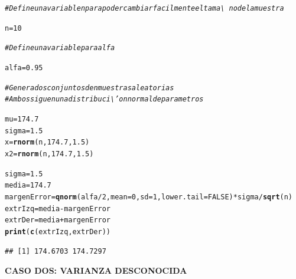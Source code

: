 \documentclass[12pt,letterpaper]{article}\usepackage[]{graphicx}\usepackage[]{color}
\makeatletter
\newcommand{\hlnum}[1]{\textcolor[rgb]{0.686,0.059,0.569}{#1}}%
\newcommand{\hlcom}[1]{\textcolor[rgb]{0.678,0.584,0.686}{\textit{#1}}}%
\newcommand{\hlopt}[1]{\textcolor[rgb]{0,0,0}{#1}}%
\newcommand{\hlstd}[1]{\textcolor[rgb]{0.345,0.345,0.345}{#1}}%
\newcommand{\hlkwb}[1]{\textcolor[rgb]{0.69,0.353,0.396}{#1}}%
\newcommand{\hlkwc}[1]{\textcolor[rgb]{0.333,0.667,0.333}{#1}}%
\newcommand{\hlkwd}[1]{\textcolor[rgb]{0.737,0.353,0.396}{\textbf{#1}}}%
\newenvironment{kframe}{%
 \def\at@end@of@kframe{}%
 \ifinner\ifhmode%
  \def\at@end@of@kframe{\end{minipage}}%
  \begin{minipage}{\columnwidth}%
 \fi\fi%
 \def\FrameCommand##1{\hskip\@totalleftmargin \hskip-\fboxsep
 \colorbox{shadecolor}{##1}\hskip-\fboxsep
     \hskip-\linewidth \hskip-\@totalleftmargin \hskip\columnwidth}%
 \MakeFramed {\advance\hsize-\width
   \@totalleftmargin\z@ \linewidth\hsize
   \@setminipage}}%
 {\par\unskip\endMakeFramed%
 \at@end@of@kframe}
\newenvironment{knitrout}{}{} %
\makeatother
\begin{document}
\begin{knitrout}
\color{fgcolor}\begin{kframe}
\begin{alltt}
\hlcom{# Define una variable n para poder cambiar facilmente el tama\textbackslash{}~no de la muestra}

\hlstd{n} \hlkwb{=} \hlnum{10}

\hlcom{# Define una variable para alfa }

\hlstd{alfa} \hlkwb{=} \hlnum{0.95}

\hlcom{# Genera dos conjuntos de n muestras aleatorias }
\hlcom{# Ambos siguen una distribuci\textbackslash{}'on normal de parametros }

\hlstd{mu} \hlkwb{=} \hlnum{174.7}
\hlstd{sigma} \hlkwb{=} \hlnum{1.5}
\hlstd{x} \hlkwb{=} \hlkwd{rnorm}\hlstd{(n,} \hlnum{174.7}\hlstd{,} \hlnum{1.5}\hlstd{)}
\hlstd{x2} \hlkwb{=} \hlkwd{rnorm}\hlstd{(n,} \hlnum{174.7}\hlstd{,} \hlnum{1.5}\hlstd{)}

\hlstd{sigma} \hlkwb{=} \hlnum{1.5}
\hlstd{media} \hlkwb{=} \hlnum{174.7}
\hlstd{margenError} \hlkwb{=} \hlkwd{qnorm}\hlstd{(alfa}\hlopt{/}\hlnum{2}\hlstd{,} \hlkwc{mean}\hlstd{=}\hlnum{0}\hlstd{,} \hlkwc{sd}\hlstd{=}\hlnum{1}\hlstd{,} \hlkwc{lower.tail} \hlstd{=} \hlnum{FALSE}\hlstd{)}\hlopt{*}\hlstd{sigma}\hlopt{/}\hlkwd{sqrt}\hlstd{(n)}
\hlstd{extrIzq} \hlkwb{=} \hlstd{media} \hlopt{-} \hlstd{margenError}
\hlstd{extrDer} \hlkwb{=} \hlstd{media} \hlopt{+} \hlstd{margenError}
\hlkwd{print}\hlstd{(}\hlkwd{c}\hlstd{(extrIzq, extrDer))}
\end{alltt}
\begin{verbatim}
## [1] 174.6703 174.7297
\end{verbatim}
\end{kframe}
\end{knitrout}

\begin{center}
\textbf{CASO DOS: VARIANZA DESCONOCIDA}
\end{center}
\end{document}
